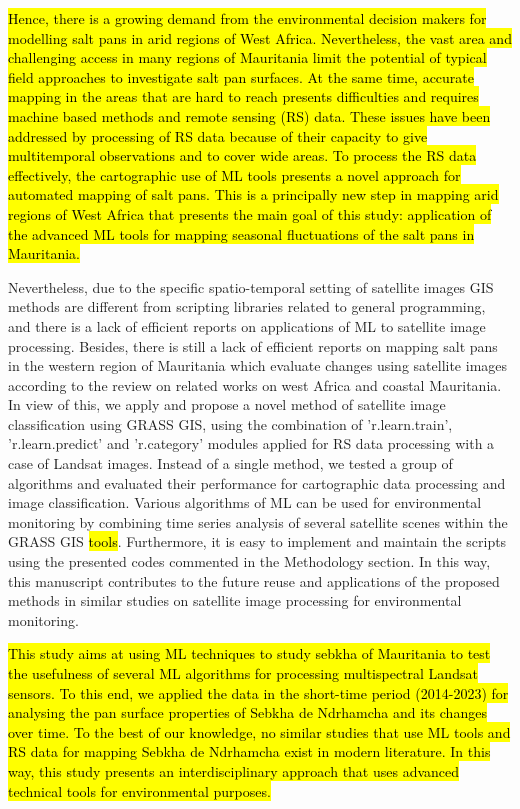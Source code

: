 \documentclass[12pt,a4paper,oneside]{article}
\def \newpar{\vspace{6pt}}
\begin{document}
\newpar \hl{Hence, there is a growing demand from the environmental decision makers for modelling salt pans in arid regions of West Africa. Nevertheless, the vast area and challenging access in many regions of Mauritania limit the potential of typical field approaches to investigate salt pan surfaces. At the same time, accurate mapping in the areas that are hard to reach presents difficulties and requires machine based methods and remote sensing (RS) data. These issues have been addressed by processing of RS data because of their capacity to give multitemporal observations and to cover wide areas. To process the RS data effectively, the cartographic use of ML tools presents a novel approach for automated mapping of salt pans.  This is a principally new step in mapping arid regions of West Africa that presents the main goal of this study: application of the advanced ML tools for mapping seasonal fluctuations of the salt pans in Mauritania.}  

\newpar Nevertheless, due to the specific spatio-temporal setting of satellite images\hl{ }GIS methods are different from scripting libraries related to general programming, and there is a lack of efficient reports on applications of ML to satellite image processing. Besides, there is still a lack of efficient reports on mapping salt pans in the western region of Mauritania which evaluate changes using satellite images according to the review on related works on west Africa and coastal Mauritania. In view of this, we apply and propose a novel method of satellite image classification using GRASS GIS, using the combination of 'r.learn.train', 'r.learn.predict' and 'r.category' modules applied for RS data processing with a case of Landsat images. Instead of a single method, we tested a group of algorithms and evaluated their performance for cartographic data processing and image classification. Various algorithms of ML can be used for environmental monitoring by combining time series analysis of several satellite scenes within the GRASS GIS \hl{tools}. Furthermore, it is easy to implement and maintain the scripts using the presented codes commented in the Methodology section. In this way, this manuscript contributes to the future reuse and applications of the proposed methods in similar studies on satellite image processing for environmental monitoring.

\newpar \hl{This study aims at using ML techniques to study sebkha of Mauritania to test the usefulness of several ML algorithms for processing multispectral Landsat sensors. To this end, we applied the data in the short-time period (2014-2023) for analysing the pan surface properties of Sebkha de Ndrhamcha and its changes over time. To the best of our knowledge, no similar studies that use ML tools and RS data for mapping Sebkha de Ndrhamcha exist in modern literature. In this way, this study presents an interdisciplinary approach that uses advanced technical tools for environmental purposes.}
\end{document}
